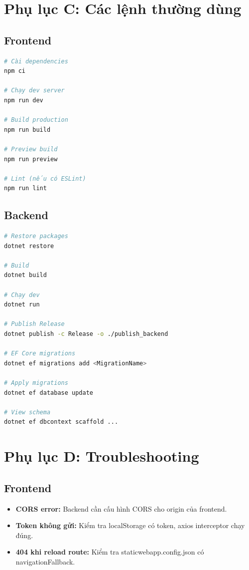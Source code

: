 \documentclass[12pt,a4paper,oneside]{report}
\begin{document}
\chapter{Phụ lục C: Các lệnh thường dùng}

\section{Frontend}

\begin{lstlisting}[language=bash,caption={Lệnh frontend}]
# Cài dependencies
npm ci

# Chạy dev server
npm run dev

# Build production
npm run build

# Preview build
npm run preview

# Lint (nếu có ESLint)
npm run lint
\end{lstlisting}

\section{Backend}

\begin{lstlisting}[language=bash,caption={Lệnh backend}]
# Restore packages
dotnet restore

# Build
dotnet build

# Chạy dev
dotnet run

# Publish Release
dotnet publish -c Release -o ./publish_backend

# EF Core migrations
dotnet ef migrations add <MigrationName>

# Apply migrations
dotnet ef database update

# View schema
dotnet ef dbcontext scaffold ...
\end{lstlisting}

\chapter{Phụ lục D: Troubleshooting}

\section{Frontend}

\begin{itemize}[itemsep=2pt]
  \item \textbf{CORS error:} Backend cần cấu hình CORS cho origin của frontend.
  \item \textbf{Token không gửi:} Kiểm tra localStorage có token, axios interceptor chạy đúng.
  \item \textbf{404 khi reload route:} Kiểm tra staticwebapp.config.json có navigationFallback.
\end{itemize}
\end{document}
